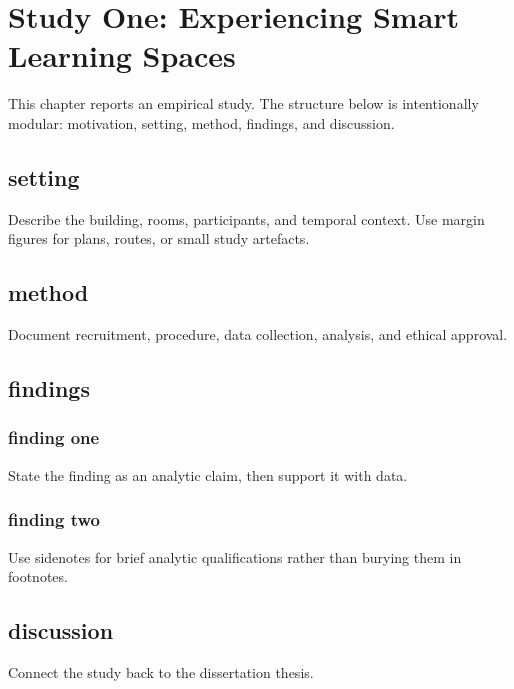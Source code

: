\chapter{Study One: Experiencing Smart Learning Spaces}\label{ch:study-one}

\begin{synopsis}
This chapter reports an empirical study. The structure below is intentionally modular: motivation, setting, method, findings, and discussion.
\end{synopsis}

\section{setting}
Describe the building, rooms, participants, and temporal context. Use margin figures for plans, routes, or small study artefacts.

\begin{marginfigure}
\end{marginfigure}

\section{method}
Document recruitment, procedure, data collection, analysis, and ethical approval.

\section{findings}
\subsection{finding one}
State the finding as an analytic claim, then support it with data.

\subsection{finding two}
Use sidenotes for brief analytic qualifications rather than burying them in footnotes.

\section{discussion}
Connect the study back to the dissertation thesis.
